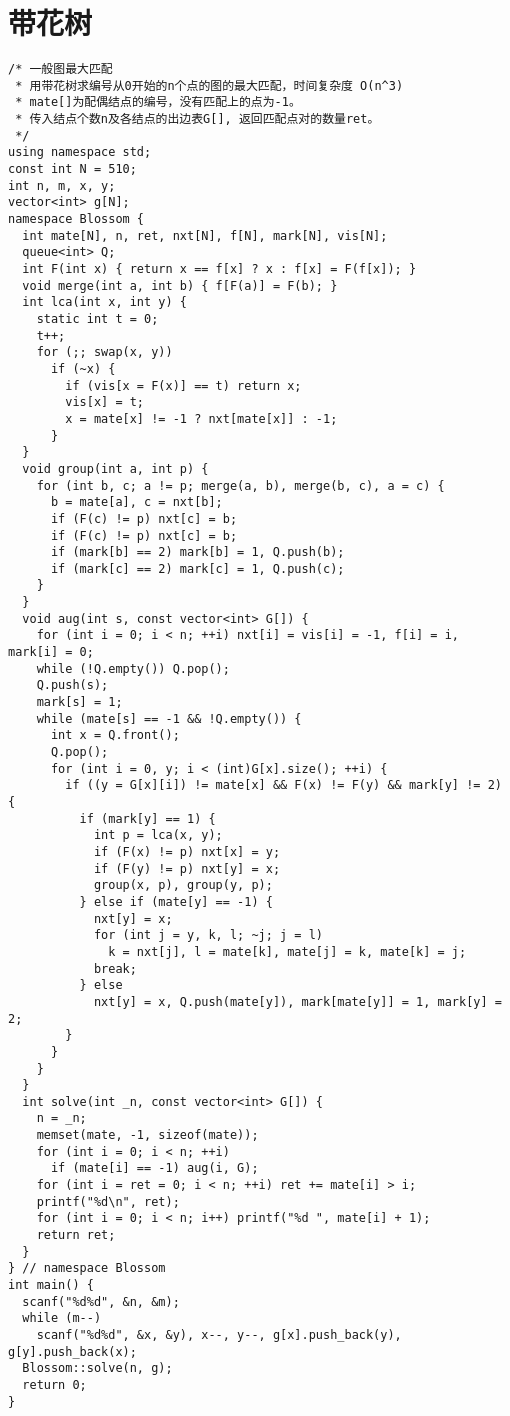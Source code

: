 \section{带花树}

\begin{lstlisting}
/* 一般图最大匹配
 * 用带花树求编号从0开始的n个点的图的最大匹配，时间复杂度 O(n^3)
 * mate[]为配偶结点的编号，没有匹配上的点为-1。
 * 传入结点个数n及各结点的出边表G[], 返回匹配点对的数量ret。
 */
using namespace std;
const int N = 510;
int n, m, x, y;
vector<int> g[N];
namespace Blossom {
  int mate[N], n, ret, nxt[N], f[N], mark[N], vis[N];
  queue<int> Q;
  int F(int x) { return x == f[x] ? x : f[x] = F(f[x]); }
  void merge(int a, int b) { f[F(a)] = F(b); }
  int lca(int x, int y) {
    static int t = 0;
    t++;
    for (;; swap(x, y))
      if (~x) {
        if (vis[x = F(x)] == t) return x;
        vis[x] = t;
        x = mate[x] != -1 ? nxt[mate[x]] : -1;
      }
  }
  void group(int a, int p) {
    for (int b, c; a != p; merge(a, b), merge(b, c), a = c) {
      b = mate[a], c = nxt[b];
      if (F(c) != p) nxt[c] = b;
      if (F(c) != p) nxt[c] = b;
      if (mark[b] == 2) mark[b] = 1, Q.push(b);
      if (mark[c] == 2) mark[c] = 1, Q.push(c);
    }
  }
  void aug(int s, const vector<int> G[]) {
    for (int i = 0; i < n; ++i) nxt[i] = vis[i] = -1, f[i] = i, mark[i] = 0;
    while (!Q.empty()) Q.pop();
    Q.push(s);
    mark[s] = 1;
    while (mate[s] == -1 && !Q.empty()) {
      int x = Q.front();
      Q.pop();
      for (int i = 0, y; i < (int)G[x].size(); ++i) {
        if ((y = G[x][i]) != mate[x] && F(x) != F(y) && mark[y] != 2) {
          if (mark[y] == 1) {
            int p = lca(x, y);
            if (F(x) != p) nxt[x] = y;
            if (F(y) != p) nxt[y] = x;
            group(x, p), group(y, p);
          } else if (mate[y] == -1) {
            nxt[y] = x;
            for (int j = y, k, l; ~j; j = l)
              k = nxt[j], l = mate[k], mate[j] = k, mate[k] = j;
            break;
          } else
            nxt[y] = x, Q.push(mate[y]), mark[mate[y]] = 1, mark[y] = 2;
        }
      }
    }
  }
  int solve(int _n, const vector<int> G[]) {
    n = _n;
    memset(mate, -1, sizeof(mate));
    for (int i = 0; i < n; ++i)
      if (mate[i] == -1) aug(i, G);
    for (int i = ret = 0; i < n; ++i) ret += mate[i] > i;
    printf("%d\n", ret);
    for (int i = 0; i < n; i++) printf("%d ", mate[i] + 1);
    return ret;
  }
} // namespace Blossom
int main() {
  scanf("%d%d", &n, &m);
  while (m--)
    scanf("%d%d", &x, &y), x--, y--, g[x].push_back(y), g[y].push_back(x);
  Blossom::solve(n, g);
  return 0;
}
\end{lstlisting}

